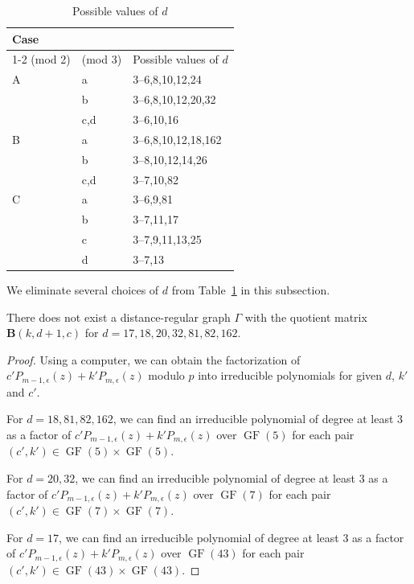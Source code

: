 \documentclass[ALCO,ThmDefs,Unicode,epreuves]{cedram}
\DeclareMathOperator{\GF}{GF}
\begin{document}
\begin{table}[htb]\centering
\caption{Possible values of $d$} \label{tb:d_list}
\renewcommand{\arraystretch}{1.2}
\begin{tabular}{|l|l|l|}
\hline
\multicolumn{2}{|l|}{Case}  & \\
\cline{1-2}
(mod 2) & (mod 3) & Possible values of $d$\\
\hline
A & a & 3--6,8,10,12,24 \\
&b & 3--6,8,10,12,20,32 \\
&c,d & 3--6,10,16\\ 
B & a & 3--6,8,10,12,18,162 \\
&b & 3--8,10,12,14,26 \\
&c,d & 3--7,10,82\\
C & a& 3--6,9,81\\
&b& 3--7,11,17\\
&c&3--7,9,11,13,25\\
&d&3--7,13 \\
\hline
\end{tabular}
\end{table}

We eliminate several choices of $d$ from Table~\ref{tb:d_list} in this subsection. 
\begin{prop}\label{prop:1}
There does not exist a 
distance-regular graph $\Gamma$ with the quotient matrix $\boldsymbol{B} (k,d+1,c)$ for $d=17,18,20,32,81,82,162$. 
\end{prop}
\begin{proof}
Using a computer, we can obtain the factorization of $c'P_{m-1,\epsilon}(z)+k'P_{m,\epsilon}(z)$ modulo $p$ into irreducible polynomials for given $d$, $k'$ and $c'$. 

For $d=18,81,82,162$, we can find an irreducible polynomial of degree at least $3$ as a factor of $c'P_{m-1,\epsilon}(z)+k'P_{m,\epsilon}(z)$ over $\GF (5)$ for each pair $(c',k') \in \GF (5)\times \GF (5)$. 

For $d=20,32$, we can find an irreducible polynomial of degree at least $3$ as a factor of $c'P_{m-1,\epsilon}(z)+k'P_{m,\epsilon}(z)$ over $\GF (7)$ for each pair $(c',k')\in \GF (7)\times \GF (7)$. 

For $d=17$, we can find an irreducible polynomial of degree at least $3$ as a factor of $c'P_{m-1,\epsilon}(z)+k'P_{m,\epsilon}(z)$ over $\GF (43)$ for each pair $(c',k')\in \GF (43)\times \GF (43)$.
\end{proof}
\end{document}
